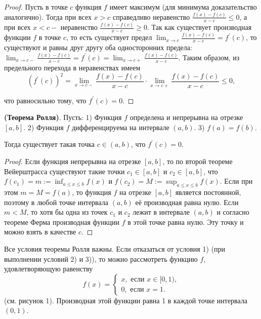 \begin{proof}
    Пусть в точке $c$ функция $f$ имеет максимум (для минимума доказательство аналогично). Тогда при всех $x>c$ справедливо неравенство $\frac{f(x)-f(c)}{x-c} \leq 0$, а при всех $x<c-$ неравенство $\frac{f(x)-f(c)}{x-c} \geq 0$. Так как существует производная функции $f$ в точке $c$, то есть существует предел $\lim _{x \rightarrow c} \frac{f(x)-f(c)}{x-c}=f^{\prime}(c)$, то существуют и равны друг другу оба односторонних предела: $\lim _{x \rightarrow c-} \frac{f(x)-f(c)}{x-c}=f^{\prime}(c)=\lim _{x \rightarrow c+} \frac{f(x)-f(c)}{x-c}$. Таким образом, из предельного перехода в неравенствах имеем
    $$
        \left(f^{\prime}(c)\right)^2=\lim _{x \rightarrow c-} \frac{f(x)-f(c)}{x-c} \cdot \lim _{x \rightarrow c+} \frac{f(x)-f(c)}{x-c} \leq 0,
    $$

    что равносильно тому, что $f^{\prime}(c)=0$.
\end{proof}

\begin{theorem} \textbf{(Теорема Ролля)}.
    Пусть:
    1) Функция $f$ определена и непрерывна на отрезке $[a, b]$.
    2) Функция $f$ дифференцируема на интервале $(a, b)$.
    3) $f(a)=f(b)$.

    Тогда существует такая точка $c \in(a, b)$, что $f^{\prime}(c)=0$.
\end{theorem}

\begin{proof}
    Если функция непрерывна на отрезке $[a, b]$, то по второй теореме Вейерштрасса существуют такие точки $c_1 \in[a, b]$ и $c_2 \in[a, b]$, что $f\left(c_1\right)=m:=\inf _{a \leq x \leq b} f(x)$ и $f\left(c_2\right)=M:=\sup _{a \leq x \leq b} f(x)$. Если при этом $m=M=f(a)$, то функция $f$ на отрезке $[a, b]$ является постоянной, поэтому в любой точке интервала $(a, b)$ её производная равна нулю. Если $m<M$, то хотя бы одна из точек $c_1$ и $c_2$ лежит в интервале $(a, b)$ и согласно теореме Ферма производная функции $f$ в этой точке равна нулю. Эту точку и можно взять в качестве $c$.
\end{proof}

Все условия теоремы Ролля важны. Если отказаться от условия 1) (при выполнении условий 2) и 3)), то можно рассмотреть функцию $f$, удовлетворяющую равенству
$$
    f(x)=\left\{\begin{array}{l}
        x, \text { если } x \in[0,1), \\
        0, \text { если } x=1 .
    \end{array}\right.
$$
(см. рисунок 1). Производная этой функции равна 1 в каждой точке интервала $(0,1)$.

